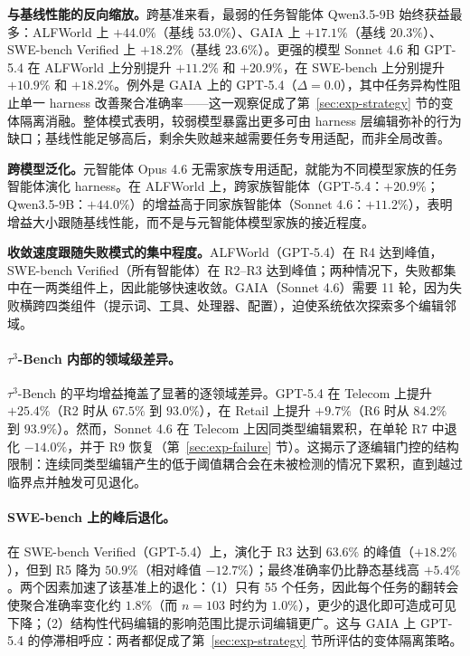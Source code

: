 \textbf{与基线性能的反向缩放。}跨基准来看，最弱的任务智能体 Qwen3.5-9B 始终获益最多：ALFWorld 上 $+44.0\%$（基线 $53.0\%$）、GAIA 上 $+17.1\%$（基线 $20.3\%$）、SWE-bench Verified 上 $+18.2\%$（基线 $23.6\%$）。更强的模型 Sonnet 4.6 和 GPT-5.4 在 ALFWorld 上分别提升 $+11.2\%$ 和 $+20.9\%$，在 SWE-bench 上分别提升 $+10.9\%$ 和 $+18.2\%$。例外是 GAIA 上的 GPT-5.4（$\Delta{=}0.0$），其中任务异构性阻止单一 harness 改善聚合准确率——这一观察促成了第~\ref{sec:exp-strategy} 节的变体隔离消融。整体模式表明，较弱模型暴露出更多可由 harness 层编辑弥补的行为缺口；基线性能足够高后，剩余失败越来越需要任务专用适配，而非全局改善。

\textbf{跨模型泛化。}元智能体 Opus 4.6 无需家族专用适配，就能为不同模型家族的任务智能体演化 harness。在 ALFWorld 上，跨家族智能体（GPT-5.4：$+20.9\%$；Qwen3.5-9B：$+44.0\%$）的增益高于同家族智能体（Sonnet 4.6：$+11.2\%$），表明增益大小跟随基线性能，而不是与元智能体模型家族的接近程度。

\textbf{收敛速度跟随失败模式的集中程度。}ALFWorld（GPT-5.4）在 R4 达到峰值，SWE-bench Verified（所有智能体）在 R2--R3 达到峰值；两种情况下，失败都集中在一两类组件上，因此能够快速收敛。GAIA（Sonnet 4.6）需要 11 轮，因为失败横跨四类组件（提示词、工具、处理器、配置），迫使系统依次探索多个编辑邻域。

\paragraph{$\tau^3$-Bench 内部的领域级差异。}
$\tau^3$-Bench 的平均增益掩盖了显著的逐领域差异。GPT-5.4 在 Telecom 上提升 $+25.4\%$（R2 时从 $67.5\%$ 到 $93.0\%$），在 Retail 上提升 $+9.7\%$（R6 时从 $84.2\%$ 到 $93.9\%$）。然而，Sonnet 4.6 在 Telecom 上因同类型编辑累积，在单轮 R7 中退化 $-14.0\%$，并于 R9 恢复（第~\ref{sec:exp-failure} 节）。这揭示了逐编辑门控的结构限制：连续同类型编辑产生的低于阈值耦合会在未被检测的情况下累积，直到越过临界点并触发可见退化。

\paragraph{SWE-bench 上的峰后退化。}
在 SWE-bench Verified（GPT-5.4）上，演化于 R3 达到 $63.6\%$ 的峰值（$+18.2\%$），但到 R5 降为 $50.9\%$（相对峰值 $-12.7\%$）；最终准确率仍比静态基线高 $+5.4\%$。两个因素加速了该基准上的退化：（1）只有 55 个任务，因此每个任务的翻转会使聚合准确率变化约 $1.8\%$（而 $n{=}103$ 时约为 $1.0\%$），更少的退化即可造成可见下降；（2）结构性代码编辑的影响范围比提示词编辑更广。这与 GAIA 上 GPT-5.4 的停滞相呼应：两者都促成了第~\ref{sec:exp-strategy} 节所评估的变体隔离策略。

